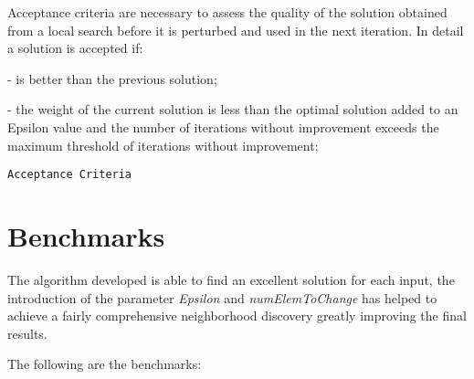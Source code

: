 \documentclass[11pt, oneside]{article}
\begin{document}
Acceptance criteria are necessary to assess the quality of the solution obtained from a local search before it is perturbed and used in the next iteration. In detail a solution is accepted if:

-       is better than the previous solution;

\qquad

-	the weight of the current solution is less than the optimal solution added to an Epsilon value and the number of iterations without improvement exceeds the maximum threshold of iterations without improvement;


\qquad

\qquad


\begin{algorithm}
    \caption{\texttt{Acceptance Criteria}}
    \begin{algorithmic}
	\Else{}
 \EndIf{}
            
    \end{algorithmic}
    \end{algorithm}



\pagebreak


\section{Benchmarks}

The algorithm developed is able to find an excellent solution for each input, the introduction of the parameter \textit{Epsilon} and \textit{numElemToChange} has helped to achieve a fairly comprehensive neighborhood discovery greatly improving the final results.

\qquad

The following are the benchmarks: 
\end{document}
